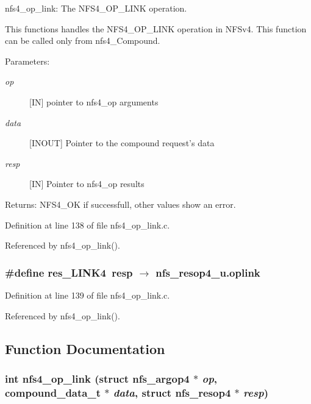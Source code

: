 nfs4\_\-op\_\-link: The NFS4\_\-OP\_\-LINK operation.

This functions handles the NFS4\_\-OP\_\-LINK operation in NFSv4. This function can be called only from nfs4\_\-Compound.

\begin{Desc}
\item[Parameters:]
\begin{description}
\item[{\em op}][IN] pointer to nfs4\_\-op arguments \item[{\em data}][INOUT] Pointer to the compound request's data \item[{\em resp}][IN] Pointer to nfs4\_\-op results\end{description}
\end{Desc}
\begin{Desc}
\item[Returns:]NFS4\_\-OK if successfull, other values show an error. \end{Desc}


Definition at line 138 of file nfs4\_\-op\_\-link.c.

Referenced by nfs4\_\-op\_\-link().
\subsubsection{\setlength{\rightskip}{0pt plus 5cm}\#define res\_\-LINK4\ resp $\rightarrow$ nfs\_\-resop4\_\-u.oplink}\label{nfs4__op__link_8c_a1}




Definition at line 139 of file nfs4\_\-op\_\-link.c.

Referenced by nfs4\_\-op\_\-link().

\subsection{Function Documentation}
\subsubsection{\setlength{\rightskip}{0pt plus 5cm}int nfs4\_\-op\_\-link (struct nfs\_\-argop4 $\ast$ {\em op}, compound\_\-data\_\-t $\ast$ {\em data}, struct nfs\_\-resop4 $\ast$ {\em resp})}\label{nfs4__op__link_8c_a2}




